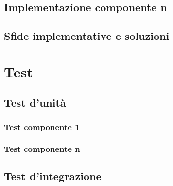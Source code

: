\subsection{Implementazione componente n}

\subsection{Sfide implementative e soluzioni}


\section{Test}


\subsection{Test d'unit\`a}


\subsubsection{Test componente 1}

\subsubsection{Test componente n}

\subsection{Test d'integrazione}


